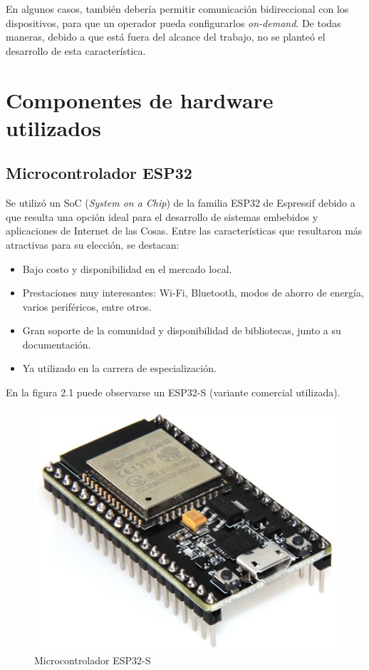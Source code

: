 En algunos casos, también debería permitir comunicación bidireccional con los dispositivos, para que un operador pueda configurarlos \textit{on-demand}. De todas maneras, debido a que está fuera del alcance del trabajo, no se planteó el desarrollo de esta característica.

\section{Componentes de hardware utilizados}

\subsection{Microcontrolador ESP32}



Se utilizó un SoC (\textit{System on a Chip}) de la familia ESP32 de Espressif debido a que resulta una opción ideal para el desarrollo de sistemas embebidos y aplicaciones de Internet de las Cosas. Entre las características que resultaron más atractivas para su elección, se destacan\citep{ESP32:1}:
\begin{itemize}
	\item Bajo costo y disponibilidad en el mercado local.
	\item Prestaciones muy interesantes: Wi-Fi, Bluetooth, modos de ahorro de energía, varios periféricos, entre otros.
	\item Gran soporte de la comunidad y disponibilidad de bibliotecas, junto a su documentación.
	\item Ya utilizado en la carrera de especialización.
\end{itemize}

En la figura 2.1 puede observarse un ESP32-S (variante comercial utilizada).

\begin{figure}[H]
	\centering
	\includegraphics[width=.6\textwidth]{./Figures/esp32s.png}
	\caption{Microcontrolador ESP32-S}
	\label{fig:texmaker}
\end{figure}

